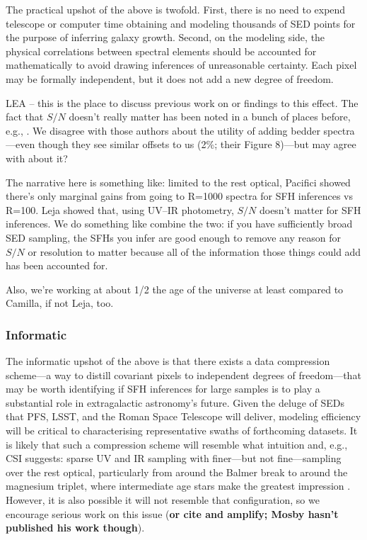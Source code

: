 \documentclass[a4paper,fleqn,usenatbib]{mnras}
\newcommand{\bfr}{\bf\color{red}}
\newcommand{\bfb}{\color{myblue}}
\begin{document}
The practical upshot of the above is twofold. First, there is no need to expend telescope
or computer time obtaining and modeling thousands of SED points for the purpose of inferring 
galaxy growth. Second, on the modeling side, the physical correlations between spectral
elements should be accounted for mathematically to avoid drawing inferences of unreasonable 
certainty. Each pixel may be formally independent, but it does not add a new degree of freedom.
{\bfb LEA -- this is the place to discuss previous work on or findings to this effect. The fact
that $S/N$ doesn't really matter has been noted in a bunch of places before, e.g., \citet{Leja19}.
We disagree with those authors about the utility of adding bedder spectra---even though they
see similar offsets to us (2\%; their Figure 8)---but may agree with \citet{Ocvirk06} about it?

The narrative here is something like: limited to the rest optical, Pacifici showed there's only
marginal gains from going to R=1000 spectra for SFH inferences vs R=100. Leja showed that, 
using UV--IR photometry, $S/N$ doesn't matter for SFH inferences. We do something like
combine the two: if you have sufficiently broad SED sampling, the SFHs you infer are good enough
to remove any reason for $S/N$ or resolution to matter because all of the information those
things could add has been accounted for.

Also, we're working at about 1/2 the age of the universe at least compared to Camilla, if not
Leja, too.}

\subsubsection{Informatic}

The informatic upshot of the above is that there exists a data compression scheme---a way to
distill covariant pixels to independent degrees of freedom---that may be
worth identifying if SFH inferences for large samples is to play a substantial role in extragalactic 
astronomy's future. Given the deluge of SEDs that PFS, LSST, and the Roman Space Telescope will deliver, 
modeling efficiency will be critical to characterising representative swaths of forthcoming datasets. 
It is likely that such a compression scheme will resemble what intuition
and, e.g., CSI suggests: sparse UV and IR sampling with finer---but not fine---sampling over
the rest optical, particularly from around the Balmer break to around the magnesium triplet,
where intermediate age stars make the greatest impression \citep[e.g.,][]{Dressler16}. However,
it is also possible it will not resemble that configuration, so we encourage serious work on this 
issue ({\bfr or cite and amplify; Mosby hasn't published his work though}).
\end{document}
